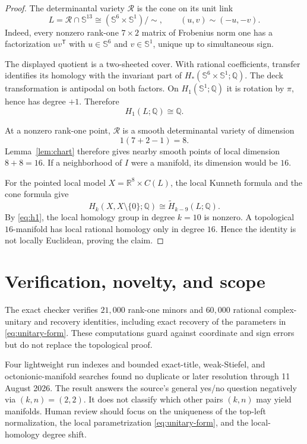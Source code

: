 \documentclass[11pt]{article}
\newcommand{\R}{\mathbb R}
\newcommand{\Q}{\mathbb Q}
\newcommand{\Sph}{\mathbb S}
\newcommand{\cR}{\mathcal R}
\begin{document}
\begin{proof}
The determinantal variety \(\cR\) is the cone on its unit link
\[
 L=\cR\cap\Sph^{13}
   \cong(\Sph^6\times\Sph^1)/\sim,
 \qquad (u,v)\sim(-u,-v).
\]
Indeed, every nonzero rank-one \(7\times2\) matrix of Frobenius norm one has
a factorization \(uv^{\mathsf T}\) with \(u\in\Sph^6\) and
\(v\in\Sph^1\), unique up to simultaneous sign.

The displayed quotient is a two-sheeted cover. With rational coefficients,
transfer identifies its homology with the invariant part of
\(H_*(\Sph^6\times\Sph^1;\Q)\). The deck transformation is antipodal on
both factors. On \(H_1(\Sph^1;\Q)\) it is rotation by \(\pi\), hence has
degree \(+1\). Therefore
\begin{equation}\label{eq:h1}
 H_1(L;\Q)\cong\Q.
\end{equation}

At a nonzero rank-one point, \(\cR\) is a smooth determinantal variety of
dimension
\[
 1(7+2-1)=8.
\]
Lemma~\ref{lem:chart} therefore gives nearby smooth points of local
dimension \(8+8=16\). If a neighborhood of \(I\) were a manifold, its
dimension would be \(16\).

For the pointed local model \(X=\R^8\times C(L)\), the local Kunneth
formula and the cone formula give
\[
 H_k(X,X\setminus\{0\};\Q)
 \cong \widetilde H_{k-9}(L;\Q).
\]
By \eqref{eq:h1}, the local homology group in degree \(k=10\) is nonzero.
A topological \(16\)-manifold has local rational homology only in degree
\(16\). Hence the identity is not locally Euclidean, proving the claim.
\end{proof}

\section{Verification, novelty, and scope}

The exact checker verifies \(21{,}000\) rank-one minors and
\(60{,}000\) rational complex-unitary and recovery identities, including exact recovery
of the parameters in \eqref{eq:unitary-form}. These computations guard
against coordinate and sign errors but do not replace the topological proof.

Four lightweight run indexes and bounded exact-title, weak-Stiefel, and
octonionic-manifold searches found no duplicate or later resolution through
11 August 2026. The result answers the source's general yes/no question
negatively via \((k,n)=(2,2)\). It does not classify which other pairs
\((k,n)\) may yield manifolds. Human review should focus on the uniqueness
of the top-left normalization, the local parametrization
\eqref{eq:unitary-form}, and the local-homology degree shift.
\end{document}
